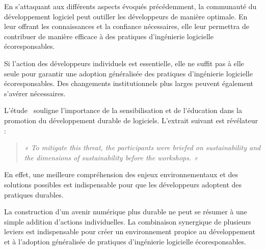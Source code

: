 En s'attaquant aux différents aspects évoqués précédemment, la communauté du développement logiciel peut outiller les développeurs de manière optimale. En leur offrant les connaissances et la confiance nécessaires, elle leur permettra de contribuer de manière efficace à des pratiques d'ingénierie logicielle écoresponsables.


Si l'action des développeurs individuels est essentielle, elle ne suffit pas à elle seule pour garantir une adoption généralisée des pratiques d'ingénierie logicielle écoresponsables. Des changements institutionnels plus larges peuvent également s'avérer nécessaires.


L'étude~\cite{SafetySecuritySustainability} souligne l'importance de la sensibilisation et de l'éducation dans la promotion du développement durable de logiciels. L'extrait suivant est révélateur :

\begin{quote}
    
    \emph{« To mitigate this threat, the participants were briefed on sustainability and the dimensions of sustainability before the workshops. »}
\end{quote}


En effet, une meilleure compréhension des enjeux environnementaux et des solutions possibles est indispensable pour que les développeurs adoptent des pratiques durables.


La construction d'un avenir numérique plus durable ne peut se résumer à une simple addition d'actions individuelles. La combinaison synergique de plusieurs leviers est indispensable pour créer un environnement propice au développement et à l'adoption généralisée de pratiques d'ingénierie logicielle écoresponsables.


